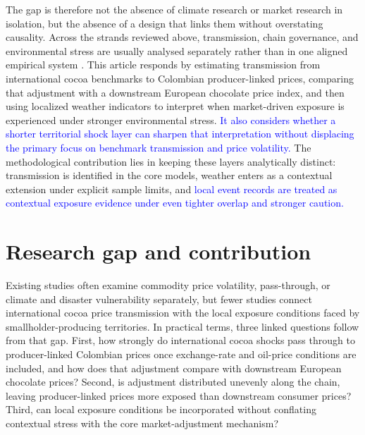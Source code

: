 \documentclass[11pt]{article}
\newcommand{\vTwo}[1]{\textcolor{blue}{#1}}
\begin{document}
The gap is therefore not the absence of climate research or market research in isolation, but the absence of a design that links them without overstating causality. Across the strands reviewed above, transmission, chain governance, and environmental stress are usually analysed separately rather than in one aligned empirical system \citep{TsowouGayi2019,Schroth2016,Mithofer2017}. This article responds by estimating transmission from international cocoa benchmarks to Colombian producer-linked prices, comparing that adjustment with a downstream European chocolate price index, and then using localized weather indicators to interpret when market-driven exposure is experienced under stronger environmental stress. \vTwo{It also considers whether a shorter territorial shock layer can sharpen that interpretation without displacing the primary focus on benchmark transmission and price volatility.} The methodological contribution lies in keeping these layers analytically distinct: transmission is identified in the core models, weather enters as a contextual extension under explicit sample limits, and \vTwo{local event records are treated as contextual exposure evidence under even tighter overlap and stronger caution.}

\section{Research gap and contribution}
\label{sec:gap}

Existing studies often examine commodity price volatility, pass-through, or climate and disaster vulnerability separately, but fewer studies connect international cocoa price transmission with the local exposure conditions faced by smallholder-producing territories. In practical terms, three linked questions follow from that gap. First, how strongly do international cocoa shocks pass through to producer-linked Colombian prices once exchange-rate and oil-price conditions are included, and how does that adjustment compare with downstream European chocolate prices? Second, is adjustment distributed unevenly along the chain, leaving producer-linked prices more exposed than downstream consumer prices? Third, can local exposure conditions be incorporated without conflating contextual stress with the core market-adjustment mechanism?
\end{document}
